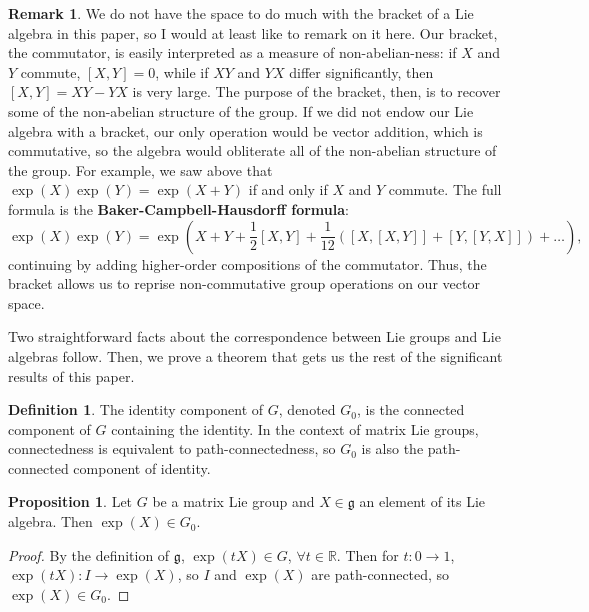 \documentclass[12pt]{article}
\newcommand{\R}{\mathbb{R}}
\newcommand{\g}{\mathfrak{g}}
\theoremstyle{definition}
\newtheorem{prop}[them]{Proposition}
\theoremstyle{definition}
\theoremstyle{definition}
\theoremstyle{definition}
\newtheorem{rmk}[them]{Remark}
\theoremstyle{definition}
\newtheorem{defn}[them]{Definition}
\theoremstyle{definition}
\theoremstyle{definition}
\theoremstyle{definition}
\begin{document}
\begin{rmk}
We do not have the space to do much with the
bracket of a Lie algebra in this paper, so I would
at least like to remark on it here. Our bracket,
the commutator, is easily interpreted as a measure
of non-abelian-ness: if $X$ and $Y$ commute,
$[X,Y] = 0$, while if $XY$ and $YX$ differ
significantly, then $[X,Y] = XY - YX$ is very
large. The purpose of the bracket, then, is to
recover some of the non-abelian structure of the
group. If we did not endow our Lie algebra with a
bracket, our only operation would be vector
addition, which is commutative, so the algebra
would obliterate all of the non-abelian structure of
the group. For example, we saw above that
$\exp(X)\exp(Y) = \exp(X + Y)$ if and only if $X$
and $Y$ commute.
The full formula is the
\textbf{Baker-Campbell-Hausdorff formula}:
\[\exp(X)\exp(Y) = \exp(X + Y + \frac{1}{2}[X,Y] +
\frac{1}{12}([X,[X,Y]] + [Y,[Y,X]]) + \hdots),\]
continuing by adding higher-order compositions of
the commutator. Thus, the bracket allows us to
reprise non-commutative group operations on our
vector space. 
\end{rmk}

\par{Two straightforward facts about the correspondence between Lie groups and Lie algebras follow. Then, we prove a theorem that gets us the rest of the significant results of this paper.}
\begin{defn} The identity component of $G$,
    denoted $G_0$, is the connected component of
    $G$ containing the identity. In the context of
    matrix Lie groups, connectedness is equivalent
    to path-connectedness, so $G_0$ is also
    the path-connected component of identity.
\end{defn}
    
\begin{prop} Let $G$ be a matrix Lie
group and $X \in \g$ an element of its Lie algebra.
Then $\exp(X) \in G_0$.
\end{prop}

\begin{proof} By the definition of $\g$,
$\exp(tX) \in G$, $\forall t \in \R$. Then for $t
: 0 \to 1$, $\exp(tX): I \to \exp(X)$, so $I$ and
$\exp(X)$ are path-connected, so $\exp(X) \in
G_0$.
\end{proof}
\end{document}
